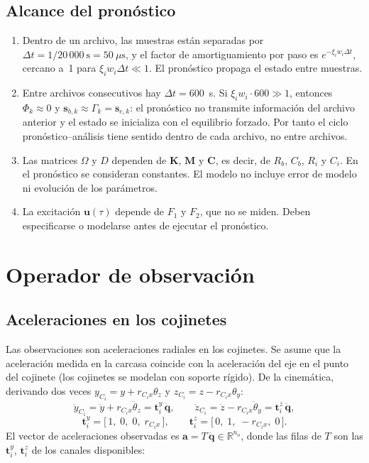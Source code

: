 \subsection{Alcance del pronóstico}

\begin{enumerate}
\item Dentro de un archivo, las muestras están separadas por $\Delta t=1/20\,000~\text{s}=50~\mu\text{s}$, y el factor de amortiguamiento por paso es $e^{-\xi_iw_i\Delta t}$, cercano a~1 para $\xi_iw_i\Delta t\ll1$. El pronóstico propaga el estado entre muestras.
\item Entre archivos consecutivos hay $\Delta t=600$~s. Si $\xi_iw_i\cdot600\gg1$, entonces $\Phi_k\approx0$ y $\mathbf s_{b,k}\approx\Gamma_k=\mathbf s_{e,k}$: el pronóstico no transmite información del archivo anterior y el estado se inicializa con el equilibrio forzado. Por tanto el ciclo pronóstico--análisis tiene sentido dentro de cada archivo, no entre archivos.
\item Las matrices $\Omega$ y $D$ dependen de $\mathbf K$, $\mathbf M$ y $\mathbf C$, es decir, de $R_b$, $C_b$, $R_i$ y $C_i$. En el pronóstico se consideran constantes. El modelo no incluye error de modelo ni evolución de los parámetros.
\item La excitación $\mathbf u(\tau)$ depende de $F_1$ y $F_2$, que no se miden. Deben especificarse o modelarse antes de ejecutar el pronóstico.
\end{enumerate}

\section{Operador de observación}

\subsection{Aceleraciones en los cojinetes}

Las observaciones son aceleraciones radiales en los cojinetes. Se asume que la aceleración medida en la carcasa coincide con la aceleración del eje en el punto del cojinete (los cojinetes se modelan con soporte rígido). De la cinemática, derivando dos veces $y_{C_i}=y+r_{C_ix}\theta_z$ y $z_{C_i}=z-r_{C_ix}\theta_y$:
\[
\ddot y_{C_i}=\ddot y+r_{C_ix}\ddot\theta_z=\mathbf t_i^{y}\,\ddot{\mathbf q},\qquad
\ddot z_{C_i}=\ddot z-r_{C_ix}\ddot\theta_y=\mathbf t_i^{z}\,\ddot{\mathbf q},
\]
\[
\mathbf t_i^{y}=\big[\,1,\;0,\;0,\;r_{C_ix}\,\big],\qquad
\mathbf t_i^{z}=\big[\,0,\;1,\;-r_{C_ix},\;0\,\big].
\]
El vector de aceleraciones observadas es $\mathbf a=T\,\ddot{\mathbf q}\in\mathbb R^{n_o}$, donde las filas de $T$ son las $\mathbf t_i^{y}$, $\mathbf t_i^{z}$ de los canales disponibles:

